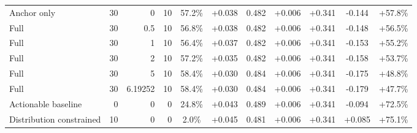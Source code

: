 \begin{table}[htbp]
\begin{tabular}{lrrrccccccc}
Anchor only & 30 & 0 & 10 & 57.2\% & +0.038 & 0.482 & +0.006 & +0.341 & -0.144 & +57.8\% \\
Full & 30 & 0.5 & 10 & 56.8\% & +0.038 & 0.482 & +0.006 & +0.341 & -0.148 & +56.5\% \\
Full & 30 & 1 & 10 & 56.4\% & +0.037 & 0.482 & +0.006 & +0.341 & -0.153 & +55.2\% \\
Full & 30 & 2 & 10 & 57.2\% & +0.035 & 0.482 & +0.006 & +0.341 & -0.158 & +53.7\% \\
Full & 30 & 5 & 10 & 58.4\% & +0.030 & 0.484 & +0.006 & +0.341 & -0.175 & +48.8\% \\
Full & 30 & 6.19252 & 10 & 58.4\% & +0.030 & 0.484 & +0.006 & +0.341 & -0.179 & +47.7\% \\
Actionable baseline & 0 & 0 & 0 & 24.8\% & +0.043 & 0.489 & +0.006 & +0.341 & -0.094 & +72.5\% \\
Distribution constrained & 10 & 0 & 0 & 2.0\% & +0.045 & 0.481 & +0.006 & +0.341 & +0.085 & +75.1\% \\
\bottomrule
\end{tabular}
\end{table}